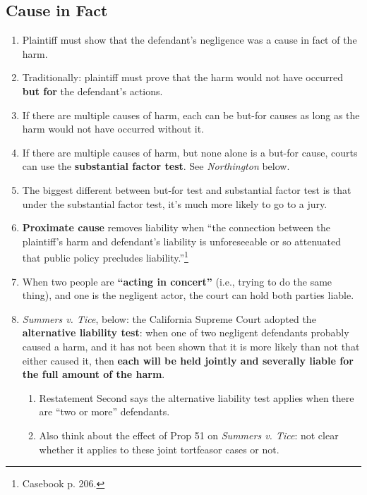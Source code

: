 \subsection{Cause in Fact}

\begin{enumerate}
    \item Plaintiff must show that the defendant's negligence was a cause in 
    fact of the harm.
    \item Traditionally: plaintiff must prove that the harm would not have 
    occurred \textbf{but for} the defendant's actions.
    \item If there are multiple causes of harm, each can be but-for causes as 
    long as the harm would not have occurred without it.
    \item If there are multiple causes of harm, but none alone is a but-for 
    cause, courts can use the \textbf{substantial factor test}. See 
    \emph{Northington} below.
    \item The biggest different between but-for test and substantial factor 
    test is that under the substantial factor test, it's much more likely to 
    go to a jury.
    \item \textbf{Proximate cause} removes liability when ``the connection 
    between the plaintiff's harm and defendant's liability is unforeseeable or 
    so attenuated that public policy precludes liability.''\footnote{Casebook 
    p. 206.}
    \item When two people are \textbf{``acting in concert''} (i.e., trying to 
    do the same thing), and one is the negligent actor, the court can hold 
    both parties liable.
    \item \emph{Summers v. Tice}, below: the California Supreme Court adopted 
    the \textbf{alternative liability test}: when one of two negligent 
    defendants probably caused a harm, and it has not been shown that it is 
    more likely than not that either caused it, then \textbf{each will be held 
    jointly and severally liable for the full amount of the harm}.
    \begin{enumerate}
        \item Restatement Second says the alternative liability test applies 
        when there are ``two or more'' defendants.
        \item Also think about the effect of Prop 51 on \emph{Summers v. 
        Tice}: not clear whether it applies to these joint tortfeasor cases or 
        not.
    \end{enumerate}

\end{enumerate}
